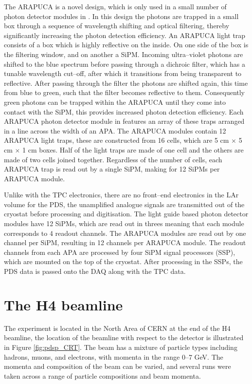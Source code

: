 The ARAPUCA is a novel design, which is only used in a small number of photon 
detector modules in \protodune{}. In this design the photons are trapped in a 
small box through a sequence of wavelength shifting and optical filtering, 
thereby significantly increasing the photon detection 
efficiency\cite{Segreto:2018jdx}. An ARAPUCA light trap consists of a box 
which is highly reflective on the inside. On one side of the box is the 
filtering window, and on another a SiPM. Incoming ultra--violet photons are 
shifted to the blue spectrum before passing through a dichroic filter, which 
has a tunable wavelength cut--off, after which it transitions from being 
transparent to reflective. After passing through the filter the photons are 
shifted again, this time from blue to green, such that the filter becomes 
reflective to them. Consequently green photons can be trapped within the 
ARAPUCA until they come into contact with the SiPM, this provides increased 
photon detection efficiency. Each ARAPUCA photon detector module in 
\protodune{} features an array of these traps arranged in a line across the 
width of an APA. The ARAPUCA modules contain 12 ARAPUCA light traps, these are 
constructed from 16 cells, which are 5 cm $\times$ 5 cm $\times$ 1 
cm boxes. Half of the light traps are made of one cell and the others are made 
of two cells joined together. Regardless of the number of cells, each ARAPUCA 
trap is read out by a single SiPM, making for 12 SiPMs per ARAPUCA module.

Unlike with the TPC electronics, there are no front--end electronics in the LAr
volume for the PDS, the unamplified analogue signals are transmitted out of the
cryostat before processing and digitisation. The light guide based photon 
detector modules have 12 SiPMs, which are read out in threes meaning that each 
module corresponds to 4 readout channels. The ARAPUCA modules are read out by
one channel per SiPM, resulting in 12 channels per ARAPUCA module. The readout 
channels from each APA are processed by four SiPM signal processors 
(SSP), which are mounted on the top of the cryostat. After processing in the 
SSPs, the PDS data is passed onto the DAQ along with the TPC data.

\section{The H4 beamline} \label{sec:h4}

The \protodune{} experiment is located in the North Area of CERN at the end of 
the H4 beamline, the location of the beamline with respect to the 
detector is illustrated in Figure \ref{fig:pdsp_CRT}. The beam has a mixture 
of particle types including hadrons, muons, and electrons, with momenta in the 
range 0--7 GeV. The momenta and composition of the beam can be varied, and 
several runs were taken across a range of particle compositions and beam 
momenta.

